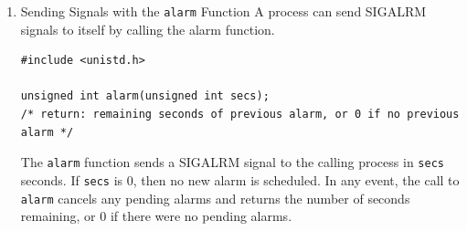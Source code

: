 \documentclass[11pt]{article}
\begin{document}
\begin{enumerate}
\noindent\rule{\textwidth}{0.5pt}
A parent uses the \texttt{kill} function to send a sigkill singal to its child:\\
\begin{verbatim}
#include "csapp.h"

int main(void)
{
    pid_t pid;

    /* child sleeps until SIGKILL signal received, then dies */
    if ((pid = Fork()) == 0) {	/* child */
        Pause();		/* wait for a signal to arrive */
        printf("control should never reach hear!\n");
        exit(0);
    }

    /* parent sends a SIGKILL signal to a child */
    Kill(pid, SIGKILL);
    exit(0);
}

\end{verbatim}

\noindent\rule{\textwidth}{0.5pt}

\item Sending Signals with the \texttt{alarm} Function
\label{sec:orgd5faaa1}
A process can send SIGALRM signals to itself by calling the alarm function.\\

\begin{verbatim}
#include <unistd.h>

unsigned int alarm(unsigned int secs);
/* return: remaining seconds of previous alarm, or 0 if no previous alarm */
\end{verbatim}
The \texttt{alarm} function sends a SIGALRM signal to the calling process in \texttt{secs} seconds. If \texttt{secs} is 0, then no new alarm is scheduled. In any event, the call to \texttt{alarm} cancels any pending alarms and returns the number of seconds remaining, or 0 if there were no pending alarms.\\
\end{enumerate}
\end{document}
